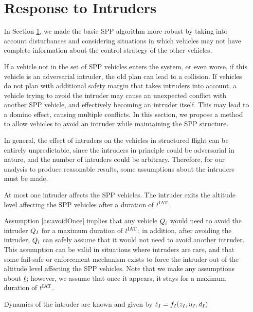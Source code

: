 \section{Response to Intruders \label{sec:HJIVI}}
In Section \ref{}, we made the basic SPP algorithm more robust by taking into account disturbances and considering situations in which vehicles may not have complete information about the control strategy of the other vehicles. 

If a vehicle not in the set of SPP vehicles enters the system, or even worse, if this vehicle is an adversarial intruder, the old plan can lead to a collision. If vehicles do not plan with additional safety margin that takes intruders into account, a vehicle trying to avoid the intruder may cause an unexpected conflict with another SPP vehicle, and effectively becoming an intruder itself. This may lead to a domino effect, causing multiple conflicts. In this section, we propose a method to allow vehicles to avoid an intruder while maintaining the SPP structure.

In general, the effect of intruders on the vehicles in structured flight can be entirely unpredictable, since the intruders in principle could be adversarial in nature, and the number of intruders could be arbitrary. Therefore, for our analysis to produce reasonable results, some assumptions about the intruders must be made.

\begin{assumption}
\label{as:avoidOnce}
At most one intruder affects the SPP vehicles.  The intruder exits the altitude level affecting the SPP vehicles after a duration of $t^\text{IAT}$.
\end{assumption}

Assumption \ref{as:avoidOnce} implies that any vehicle $Q_{i}$ would need to avoid the intruder $Q_{I}$ for a maximum duration of $t^\text{IAT}$; in addition, after avoiding the intruder, $Q_{i}$ can safely assume that it would not need to avoid another intruder. This assumption can be valid in situations where intruders are rare, and that some fail-safe or enforcement mechanism exists to force the intruder out of the altitude level affecting the SPP vehicles. Note that we make any assumptions about $\underline{t}$; however, we assume that once it appears, it stays for a maximum duration of $t^\text{IAT}$.

\begin{assumption}
\label{as:dynKnown}
Dynamics of the intruder are known and given by $\dot{z}_I = f_I(z_I, u_I, d_I)$
\end{assumption}

